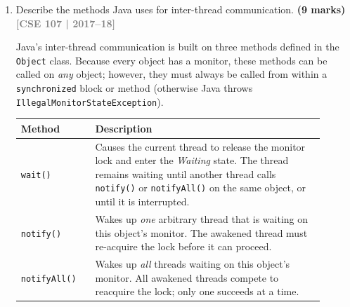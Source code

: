 \documentclass[12pt,a3paper]{article}
\newcommand{\yr}[1]{\hfill\textcolor{gray}{\small\textbf{[#1]}}}
\newcommand{\mk}[1]{\textcolor{orange!70!black}{\small\textbf{(#1 marks)}}}
\begin{document}
\begin{enumerate}
\begin{tcolorbox}
\begin{enumerate}[label=\textbf{\arabic*.}]
  \item \textbf{Better CPU utilisation:} When one thread is blocked on
    I/O, the CPU can execute another thread of the same process,
    improving throughput without spawning new heavy-weight processes.

  \item \textbf{Simplified program structure:} Tasks that are
    naturally concurrent (e.g.\ reading input and writing output
    simultaneously) can be modelled as separate threads within a
    single program, rather than as separate communicating processes.
\end{enumerate}

\end{tcolorbox}

\item Describe the methods Java uses for inter-thread communication. \mk{9}
\yr{CSE 107 | 2017--18}

\begin{tcolorbox}[enhanced,breakable,ansbox,
  colback=cF!4,colframe=cF,boxrule=0.8pt,arc=5pt,
  title={\textbf{Answer — Inter-Thread Communication in Java}},
  fonttitle=\bfseries\color{white},colbacktitle=cF]

Java's inter-thread communication is built on three methods defined
in the \texttt{Object} class.  Because every object has a monitor,
these methods can be called on \emph{any} object; however, they must
always be called from within a \texttt{synchronized} block or method
(otherwise Java throws \texttt{IllegalMonitorStateException}).

\medskip
\begin{center}
\small
\begin{tabular}{@{}p{0.22\linewidth}p{0.68\linewidth}@{}}
\toprule
\textbf{Method} & \textbf{Description} \\
\midrule
\texttt{wait()} &
  Causes the current thread to release the monitor lock and enter the
  \emph{Waiting} state.  The thread remains waiting until another
  thread calls \texttt{notify()} or \texttt{notifyAll()} on the same
  object, or until it is interrupted. \\[4pt]
\texttt{notify()} &
  Wakes up \emph{one} arbitrary thread that is waiting on this object's
  monitor.  The awakened thread must re-acquire the lock before it can
  proceed. \\[4pt]
\texttt{notifyAll()} &
  Wakes up \emph{all} threads waiting on this object's monitor.  All
  awakened threads compete to reacquire the lock; only one succeeds at
  a time. \\
\bottomrule
\end{tabular}
\end{center}


\end{tcolorbox}
\end{enumerate}
\end{document}
